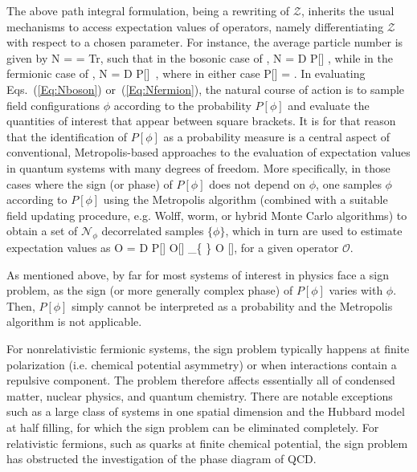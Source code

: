 \documentclass[../main.tex]{subfiles}
\begin{document}
The above path integral formulation, being a rewriting of $\mathcal Z$, inherits the usual mechanisms to access expectation values of operators,
namely differentiating $\mathcal Z$ with respect to a chosen parameter. For instance, the average particle number is given by
%
\beq
\langle \hat N \rangle =  =  \textrm{Tr},
\eeq
%
such that in the bosonic case of ,
%
\beq
\label{Eq:Nboson}
\langle \hat N \rangle = \int \mathcal D \phi\;  P[\phi] ,
\eeq
%
while in the fermionic case of ,
%
\beq
\label{Eq:Nfermion}
\langle \hat N \rangle = \int \mathcal D \phi\;  P[\phi]\, ,
\eeq
%
where in either case
%
\beq
P[\phi] = .
\eeq
%
%
In evaluating Eqs.~(\ref{Eq:Nboson}) or~(\ref{Eq:Nfermion}), the natural course of action is to sample field configurations
$\phi$ according to the probability $P[\phi]$ and evaluate the quantities of
interest that appear between square brackets.
It is for that reason that the identification of $P[\phi]$ as a probability measure is a central aspect of conventional,
Metropolis-based approaches to the evaluation of expectation values in quantum systems with many degrees of freedom.
More specifically, in those cases where the sign (or phase) of $P[\phi]$ does not depend on $\phi$, one samples $\phi$ according to
$P[\phi]$ using the Metropolis algorithm (combined with a suitable field updating procedure, e.g. Wolff, worm, or
hybrid Monte Carlo algorithms) to obtain a set of $\mathcal N_\phi$ decorrelated samples $\{ \phi \}$, which in turn
are used to estimate expectation values as
%
\beq
\langle \mathcal O \rangle = \int \mathcal D \phi \; P[\phi] \mathcal O[\phi]
\simeq {}\sum_{\{ \phi \}} \mathcal O [\phi],
\eeq
%
for a given operator $\mathcal O$.

As mentioned above, by far for most systems of interest in physics face a sign problem, as the
sign (or more generally complex phase) of $P[\phi]$ varies with $\phi$. Then, $P[\phi]$ simply cannot be interpreted
as a probability and the Metropolis algorithm is not applicable.

For nonrelativistic fermionic systems, the sign problem typically happens at finite polarization (i.e. chemical potential asymmetry)
or when interactions contain a repulsive component. The problem therefore affects essentially all of condensed matter,
nuclear physics, and quantum chemistry. There are notable exceptions such as a large class of
systems in one spatial dimension and the Hubbard model at half filling, for which the sign problem can be eliminated
completely. For relativistic fermions, such as quarks at finite chemical potential, the sign problem has obstructed the
investigation of the phase diagram of QCD.
\end{document}
